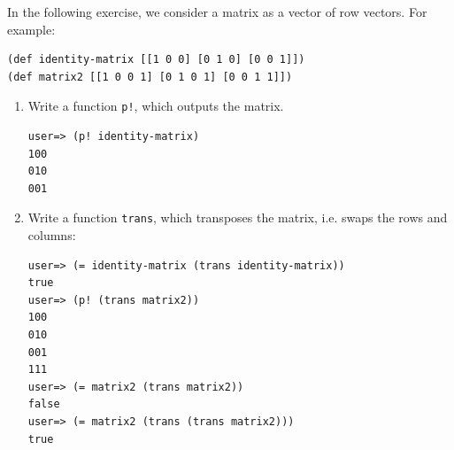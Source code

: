 \documentclass[11pt,a4paper]{article}
\begin{document}
\pagebreak

%
%



\begin{exercise}[Matrix]
In the following exercise, we consider a matrix as a vector of row vectors. For example:
\begin{verbatim}
(def identity-matrix [[1 0 0] [0 1 0] [0 0 1]])
(def matrix2 [[1 0 0 1] [0 1 0 1] [0 0 1 1]])
\end{verbatim}

\begin{enumerate}[label=\alph*)]
\item Write a function \verb|p!|, which outputs the matrix.
\begin{verbatim}
user=> (p! identity-matrix)
100
010
001
\end{verbatim}
  
\item Write a function \verb|trans|, which transposes the matrix, i.e. swaps the rows and columns:
\begin{verbatim}
user=> (= identity-matrix (trans identity-matrix))
true
user=> (p! (trans matrix2))
100
010
001
111
user=> (= matrix2 (trans matrix2))
false
user=> (= matrix2 (trans (trans matrix2)))
true 
\end{verbatim}
\end{enumerate}

\end{exercise}
\end{document}
